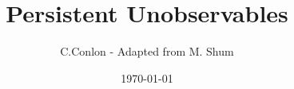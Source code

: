 





\title [Single-agent dynamic optimization models]{Persistent Unobservables}
\author{C.Conlon - Adapted from M. Shum}
\date{\today}



\begin{frame}
\titlepage
\end{frame}


